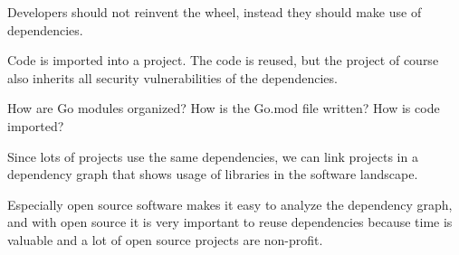 Developers should not reinvent the wheel, instead they should make use of dependencies.

Code is imported into a project. The code is reused, but the project of course also inherits
all security vulnerabilities of the dependencies.

How are Go modules organized? How is the Go.mod file written? How is code imported?

Since lots of projects use the same dependencies, we can link projects in a dependency
graph that shows usage of libraries in the software landscape.

Especially open source software makes it easy to analyze the dependency graph, and with
open source it is very important to reuse dependencies because time is valuable and a lot
of open source projects are non-profit.
